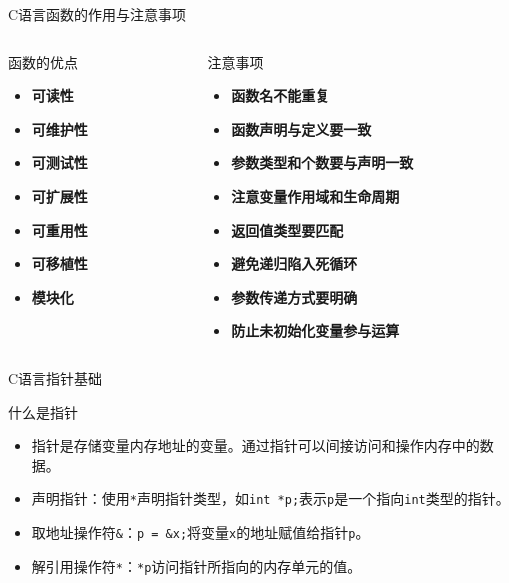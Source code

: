 \documentclass[UTF8,aspectratio=169]{beamer}
\begin{document}
\begin{frame}{C语言函数的作用与注意事项}
    \begin{columns}
        \begin{column}{0.48\textwidth}
    \begin{ytublock}{函数的优点}
        \begin{itemize}
            \item \textbf{可读性}
            \item \textbf{可维护性}
            \item \textbf{可测试性}
            \item \textbf{可扩展性}
            \item \textbf{可重用性}
            \item \textbf{可移植性}
            \item \textbf{模块化}
        \end{itemize}
    \end{ytublock}
    \end{column}
    \begin{column}{0.48\textwidth}
    \begin{ytublock}{注意事项}
        \begin{itemize}
            \item \textbf{函数名不能重复}
            \item \textbf{函数声明与定义要一致}
            \item \textbf{参数类型和个数要与声明一致}
            \item \textbf{注意变量作用域和生命周期}
            \item \textbf{返回值类型要匹配}
            \item \textbf{避免递归陷入死循环}
            \item \textbf{参数传递方式要明确}
            \item \textbf{防止未初始化变量参与运算}
        \end{itemize}
    \end{ytublock}
    \end{column}
    \end{columns}
\end{frame}

\begin{frame}{C语言指针基础}
    \begin{ytublock}{什么是指针}
        \begin{itemize}
            \item 指针是存储变量内存地址的变量。通过指针可以间接访问和操作内存中的数据。
            \item 声明指针：使用\texttt{*}声明指针类型，如\texttt{int *p;}表示\texttt{p}是一个指向\texttt{int}类型的指针。
            \item 取地址操作符\texttt{\&}：\texttt{p = \&x;}将变量\texttt{x}的地址赋值给指针\texttt{p}。
            \item 解引用操作符\texttt{*}：\texttt{*p}访问指针所指向的内存单元的值。
        \end{itemize}
    \end{ytublock}
    \inputminted[firstline=9,lastline=16]{cpp}{code/c_pointer_example.c}
\end{frame}
\end{document}
